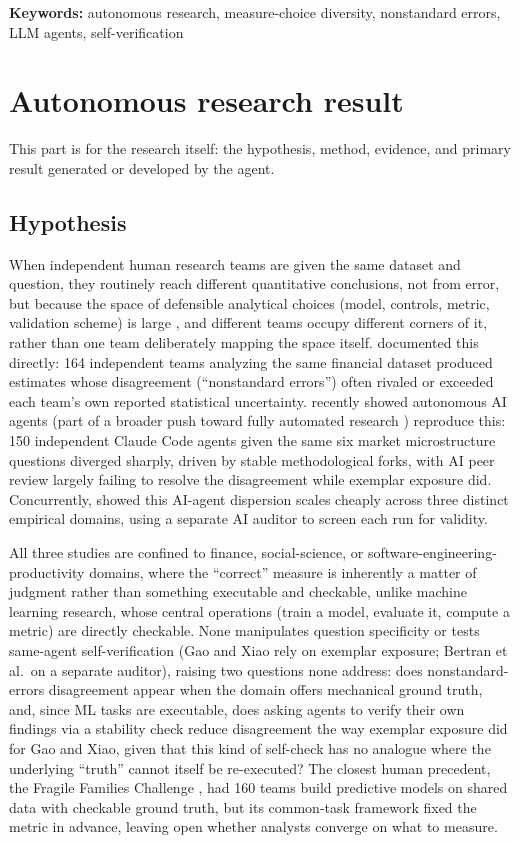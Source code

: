 \documentclass{article}
\begin{document}
\noindent\textbf{Keywords:} autonomous research, measure-choice diversity, nonstandard
errors, LLM agents, self-verification

\section{Autonomous research result}
This part is for the research itself: the hypothesis, method, evidence, and primary
result generated or developed by the agent.

\subsection{Hypothesis}
\label{sec:hypothesis}

When independent human research teams are given the same dataset and question, they
routinely reach different quantitative conclusions, not from error, but because the
space of defensible analytical choices (model, controls, metric, validation scheme) is
large \citep{steegen2016,simonsohn2020,gelmanloken2013}, and different teams occupy different corners of
it, rather than one team deliberately mapping the space itself.
\citet{menkveld2024} documented
this directly: 164 independent teams analyzing the same financial dataset produced
estimates whose disagreement (``nonstandard errors'') often rivaled or exceeded each
team's own reported statistical uncertainty. \citet{gaoxiao2026} recently showed autonomous
AI agents (part of a broader push toward fully automated research \citep{lu2024})
reproduce this: 150 independent Claude Code agents given the same six
market microstructure questions diverged sharply, driven by stable methodological forks,
with AI peer review largely failing to resolve the disagreement while exemplar exposure
did. Concurrently, \citet{bertran2026} showed this AI-agent dispersion scales cheaply
across three distinct empirical domains, using a separate AI auditor to screen each
run for validity.

All three studies are confined to finance, social-science, or software-engineering-productivity
domains, where the ``correct'' measure is inherently a matter of judgment
rather than something executable and checkable, unlike machine learning research, whose
central operations (train a model, evaluate it, compute a metric) are directly checkable.
None manipulates question specificity or tests same-agent self-verification (Gao and Xiao
rely on exemplar exposure; Bertran et al.\ on a separate auditor), raising two questions
none address: does nonstandard-errors disagreement appear when the domain offers mechanical
ground truth, and, since ML tasks are executable, does asking agents to verify their own
findings via a stability check reduce disagreement the way exemplar exposure did for Gao
and Xiao, given that this kind of self-check has no analogue where the underlying
``truth'' cannot itself be re-executed? The closest human precedent, the Fragile Families
Challenge \citep{salganik2020}, had 160 teams build predictive models on shared data with
checkable ground truth, but its common-task framework fixed the metric in advance, leaving
open whether analysts converge on what to measure.
\end{document}
